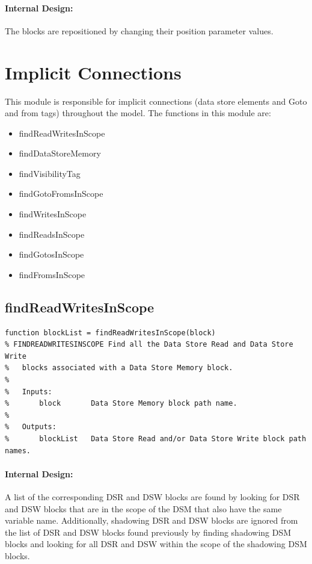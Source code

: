 \documentclass[12pt,letterpaper]{report}
\begin{document}
\paragraph{Internal Design:} The blocks are repositioned by changing their position parameter values.

\section{Implicit Connections}
\par This module is responsible for implicit connections (data store elements and Goto and from tags) throughout the model. The functions in this module are:
\begin{itemize}
	\item findReadWritesInScope
	\item findDataStoreMemory
	\item findVisibilityTag
	\item findGotoFromsInScope
	\item findWritesInScope
	\item findReadsInScope
	\item findGotosInScope
	\item findFromsInScope
\end{itemize}

\subsection{findReadWritesInScope} \label{findReadWritesInScope}
\begin{lstlisting}
function blockList = findReadWritesInScope(block)
% FINDREADWRITESINSCOPE Find all the Data Store Read and Data Store Write
%   blocks associated with a Data Store Memory block.
%
%   Inputs:
%       block       Data Store Memory block path name.
%
%   Outputs:
%       blockList   Data Store Read and/or Data Store Write block path names.
\end{lstlisting}
\paragraph{Internal Design:} A list of the corresponding DSR and DSW blocks are found by looking for DSR and DSW blocks that are in the scope of the DSM that also have the same variable name. Additionally, shadowing DSR and DSW blocks are ignored from the list of DSR and DSW blocks found previously by finding shadowing DSM blocks and looking for all DSR and DSW within the scope of the shadowing DSM blocks.
\end{document}
